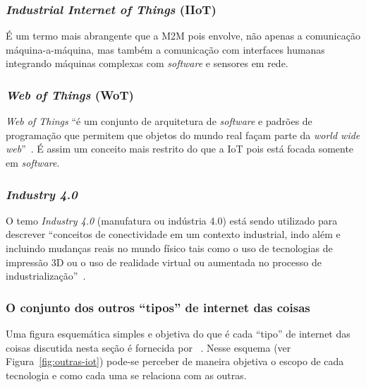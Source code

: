\documentclass[pdftex, brazil, 12pt, twoside]{article}
\newcommand{\ingles}[1]{\textit{#1}}
\begin{document}
\subsubsection{\ingles{Industrial Internet of Things} (IIoT)}
\label{o-que-e-iot-outros-tipos-iiot}

É um termo mais abrangente que a M2M pois envolve, não apenas a comunicação
máquina-a-máquina, mas também a comunicação com interfaces humanas~\citep{LuethIoT2014}
integrando máquinas complexas com \ingles{software} e sensores em rede.


\subsubsection{\ingles{Web of Things} (WoT)}
\label{o-que-e-iot-outros-tipos-wot}

\ingles{Web of Things} ``é um conjunto de
arquitetura de \ingles{software} e padrões de programação que permitem que
objetos do mundo real façam parte da \ingles{world wide web}''~\citep{LuethIoT2014}.
É assim um conceito mais restrito do que a IoT pois está focada
somente em \ingles{software}.


\subsubsection{\ingles{Industry 4.0}}
\label{o-que-e-iot-outros-tipos-industry-4.0}

O temo \ingles{Industry 4.0} (manufatura ou indústria 4.0) está sendo
utilizado para descrever ``conceitos de conectividade em um contexto industrial,
indo além e incluindo mudanças reais
no mundo físico tais como o uso de tecnologias de impressão 3D ou o uso de realidade
virtual ou aumentada no processo de industrialização''~\citep{LuethIoT2014}.


\subsubsection{O conjunto dos outros ``tipos'' de internet das coisas}
\label{o-que-e-iot-outros-tipos-conjunto}

Uma figura esquemática simples e objetiva do que é cada ``tipo'' de internet das coisas
discutida nesta seção é fornecida por ~\citet{LuethIoT2014}. Nesse esquema
(ver Figura~\ref{fig:outras-iot}) pode-se
perceber de maneira objetiva o escopo de cada tecnologia e como cada uma se relaciona
com as outras.
\end{document}
